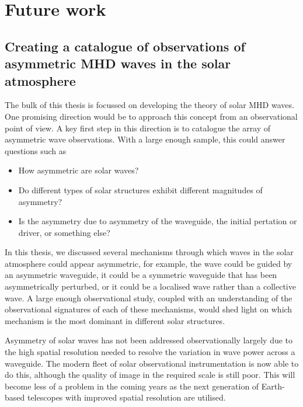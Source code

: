 \chapter{Future work}
\label{chap: future work}


\section{Creating a catalogue of observations of asymmetric MHD waves in the solar atmosphere}
The bulk of this thesis is focussed on developing the theory of solar MHD waves. One promising direction would be to approach this concept from an observational point of view. A key first step in this direction is to catalogue the array of asymmetric wave observations. With a large enough sample, this could answer questions such as
\begin{itemize}
	\item How asymmetric are solar waves?
	\item Do different types of solar structures exhibit different magnitudes of asymmetry?
	\item Is the asymmetry due to asymmetry of the waveguide, the initial pertation or driver, or something else?
\end{itemize}

In this thesis, we discussed several mechanisms through which waves in the solar atmosphere could appear asymmetric, for example, the wave could  be guided by an asymmetric waveguide, it could be a symmetric waveguide that has been asymmetrically perturbed, or it could be a localised wave rather than a collective wave. A large enough observational study, coupled with an understanding of the observational signatures of each of these mechanisms, would shed light on which mechanism is the most dominant in different solar structures.

Asymmetry of solar waves has not been addressed observationally largely due to the high spatial resolution needed to resolve the variation in wave power across a waveguide. The modern fleet of solar observational instrumentation is now able to do this, although the quality of image in the required scale is still poor. This will become less of a problem in the coming years as the next generation of Earth-based telescopes with improved spatial resolution are utilised.


